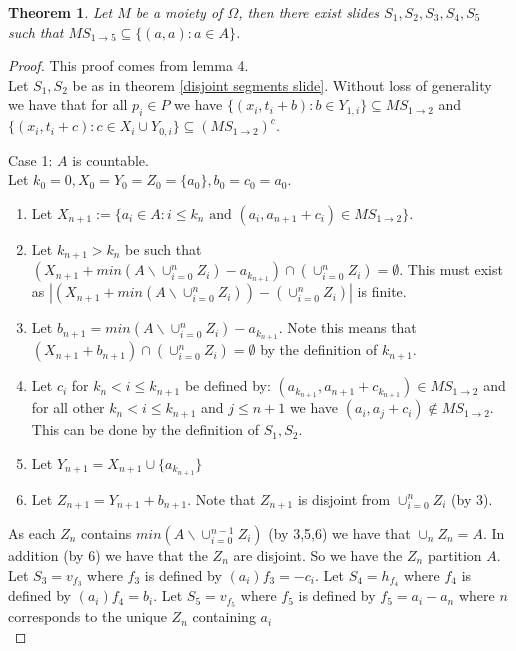 \documentclass{report}
\newtheorem{theorem}{Theorem}[section]
\begin{document}
\begin{theorem}\label{moiety to diag}
Let \(M\) be a moiety of \(\Omega\), then there exist slides \(S_1,S_2,S_3,S_4,S_5\) such that \(MS_{1\rightarrow 5}\subseteq \{(a,a):a\in A\}\).
\end{theorem}
\begin{proof}
This proof comes from \cite{shuffle2} lemma 4.\\
 Let \(S_1,S_2\) be as in theorem \ref{disjoint segments slide}. Without loss of generality we have that for all \(p_i \in P\) we have \(\{(x_i,t_i + b):b\in Y_{1,i}\}\subseteq MS_{1\rightarrow 2}\) and \(\{(x_i,t_i+c):c\in X_i\cup Y_{0,i}\}\subseteq (MS_{1\rightarrow 2})^c\).\\\par
Case 1: \(A\) is countable.\\
Let \(k_0=0,X_0=Y_0=Z_0=\{a_0\},b_0=c_0=a_0\).
\begin{enumerate}
\item Let \(X_{n+1}:=\{a_i\in A:i\leq k_n \text{ and }(a_i,a_{n+1}+c_i)\in MS_{1\rightarrow 2}\}\).
\item Let \(k_{n+1}>k_n\) be such that \((X_{n+1}+min(A\backslash \cup_{i=0}^n{Z_i})-a_{k_{n+1}})\cap (\cup_{i=0}^n{Z_i})=\emptyset\). This must exist as 
\(|(X_{n+1}+min(A\backslash \cup_{i=0}^n{Z_i}))-(\cup_{i=0}^{n}{Z_i})|\) is finite.
\item Let \(b_{n+1}=min(A\backslash \cup_{i=0}^n{Z_i})-a_{k_{n+1}}\). Note this means that \((X_{n+1}+b_{n+1})\cap (\cup_{i=0}^n{Z_i})=\emptyset\) by the definition of \(k_{n+1}\).
\item Let \(c_i\) for \(k_n<i\leq k_{n+1}\) be defined by: \((a_{k_{n+1}},a_{n+1}+c_{k_{n+1}})\in MS_{1\rightarrow 2} \) and for all other \(k_n<i\leq k_{n+1}\) and \(j\leq n+1\) we have \((a_i,a_j+c_i)\notin MS_{1\rightarrow 2}\). This can be done by the definition of \(S_1,S_2\).
\item Let \(Y_{n+1} = X_{n+1}\cup \{a_{k_{n+1}}\}\) 
\item Let \(Z_{n+1}=Y_{n+1}+b_{n+1}\). Note that \(Z_{n+1}\) is disjoint from \(\cup_{i=0}^n Z_i\) (by 3).
\end{enumerate}
As each \(Z_n\) contains \(min(A\backslash \cup_{i=0}^{n-1}{Z_i})\) (by 3,5,6) we have that \(\cup_n{Z_n}=A\). In addition (by 6) we have that the \(Z_n\) are disjoint. So we have the \(Z_n\) partition \(A\).\\
Let \(S_3=v_{f_3}\) where \(f_3\) is defined by \((a_i)f_3=-c_i\). Let \(S_4=h_{f_4}\) where \(f_4\) is defined by \((a_i)f_4=b_i\). Let \(S_5=v_{f_5}\) where \(f_5\) is defined by \(f_5=a_i-a_n\) where \(n\) corresponds to the unique \(Z_n\) containing \(a_i\)\\

\end{proof}
\end{document}
